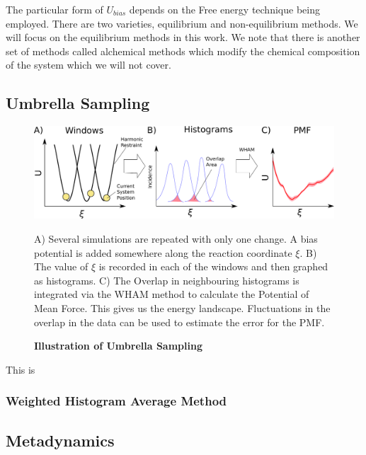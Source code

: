 The particular form of $U_{bias}$ depends on the Free energy technique being employed. There are two varieties, equilibrium and non-equilibrium methods. We will focus on the equilibrium methods in this work. We note that there is another set of methods called alchemical methods which modify the chemical composition of the system which we will not cover.  

\subsection{Umbrella Sampling}
\begin{figure}
	\begin{center}
		\includegraphics[width=\textwidth]{figures/umbrella_sampling.png.pdf}
	\end{center}
	\captionsetup{singlelinecheck = false, justification=raggedright}
	\caption[Illustration of Umbrella Sampling] {\textbf{Illustration of Umbrella Sampling}}{A) Several simulations are repeated with only one change. A bias  potential is added somewhere along the reaction coordinate $\xi$. B) The value of $\xi$ is recorded in each of the windows and then graphed as histograms. C) The Overlap in neighbouring histograms is integrated via the WHAM method to calculate the Potential of Mean Force. This gives us the energy landscape. Fluctuations in the overlap in the data can be used to estimate the error for the PMF. }
	\label{umbrella_sampling_illustration}
\end{figure}

This is 

\subsubsection{Weighted Histogram Average Method}

\subsection{Metadynamics}
